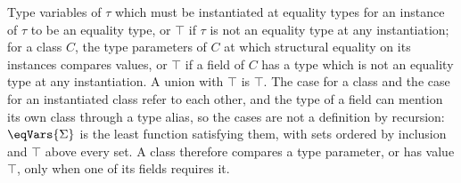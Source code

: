 Type variables of $\tau$ which must be instantiated at equality types for an instance of $\tau$ to be an equality type, or $\top$ if $\tau$ is not an equality type at any instantiation; for a class $C$, the type parameters of $C$ at which structural equality on its instances compares values, or $\top$ if a field of $C$ has a type which is not an equality type at any instantiation. A union with $\top$ is $\top$. The case for a class and the case for an instantiated class refer to each other, and the type of a field can mention its own class through a type alias, so the cases are not a definition by recursion: $\eqVars{\Sigma}$ is the least function satisfying them, with sets ordered by inclusion and $\top$ above every set. A class therefore compares a type parameter, or has value $\top$, only when one of its fields requires it.
